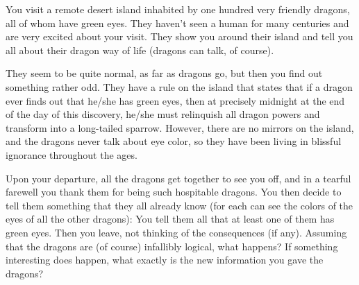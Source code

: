 \documentclass{article}
\begin{document}
\begin{exercise}
You visit a remote desert island inhabited by one hundred very friendly dragons, all of whom have green eyes. 
They haven’t seen a human for many centuries and are very excited about your visit. They show you around their island and tell you all about their dragon way of life (dragons can talk, of course).
    
They seem to be quite normal, as far as dragons go, but then you find out something rather odd. They have a rule on the island that states that if a dragon ever finds out that he/she has green eyes, then at precisely midnight at the end of the day of this discovery, he/she must relinquish all dragon powers and transform into a long-tailed sparrow. 
However, there are no mirrors on the island, and the dragons never talk about eye color, so they have been living in blissful ignorance throughout the ages.

Upon your departure, all the dragons get together to see you off, and in a tearful farewell you thank them for being such hospitable dragons. 
You then decide to tell them something that they all already know (for each can see the colors of the eyes of all the other dragons): You tell them all that at least one of them has green eyes. Then you leave, not thinking of the consequences (if any). 
Assuming that the dragons are (of course) infallibly logical, what happens? 
If something interesting does happen, what exactly is the new information you gave the dragons?
\end{exercise}
\end{document}
